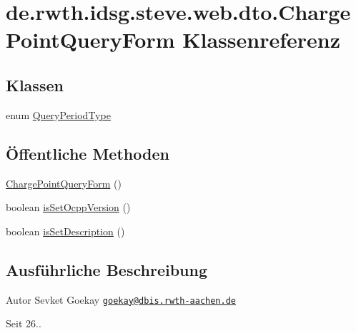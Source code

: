 \hypertarget{classde_1_1rwth_1_1idsg_1_1steve_1_1web_1_1dto_1_1_charge_point_query_form}{\section{de.\+rwth.\+idsg.\+steve.\+web.\+dto.\+Charge\+Point\+Query\+Form Klassenreferenz}
\label{classde_1_1rwth_1_1idsg_1_1steve_1_1web_1_1dto_1_1_charge_point_query_form}
}
\subsection*{Klassen}
\begin{DoxyCompactItemize}
\item 
enum \hyperlink{enumde_1_1rwth_1_1idsg_1_1steve_1_1web_1_1dto_1_1_charge_point_query_form_1_1_query_period_type}{Query\+Period\+Type}
\end{DoxyCompactItemize}
\subsection*{Öffentliche Methoden}
\begin{DoxyCompactItemize}
\item 
\hyperlink{classde_1_1rwth_1_1idsg_1_1steve_1_1web_1_1dto_1_1_charge_point_query_form_a1889afd3020e2eac0f97cc5beb559498}{Charge\+Point\+Query\+Form} ()
\item 
boolean \hyperlink{classde_1_1rwth_1_1idsg_1_1steve_1_1web_1_1dto_1_1_charge_point_query_form_a29a4aeb80a58ddce5e6d326cc43d89ed}{is\+Set\+Ocpp\+Version} ()
\item 
boolean \hyperlink{classde_1_1rwth_1_1idsg_1_1steve_1_1web_1_1dto_1_1_charge_point_query_form_ad5d5507b4b42e4701a1d79a5b16333e5}{is\+Set\+Description} ()
\end{DoxyCompactItemize}


\subsection{Ausführliche Beschreibung}
\begin{DoxyAuthor}{Autor}
Sevket Goekay \href{mailto:goekay@dbis.rwth-aachen.de}{\tt goekay@dbis.\+rwth-\/aachen.\+de} 
\end{DoxyAuthor}
\begin{DoxySince}{Seit}
26.. 
\end{DoxySince}


